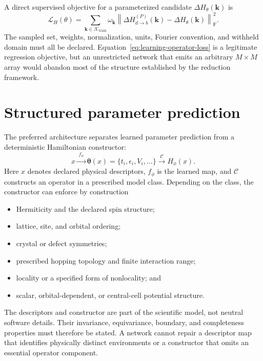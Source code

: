 A direct supervised objective for a parameterized candidate
$\Delta H_{\theta}(\mathbf k)$ is
\begin{equation}
  \mathcal L_H(\theta)
  =
  \sum_{\mathbf k\in\mathcal K_{\mathrm{train}}}
  \omega_{\mathbf k}
  \left\|
    \Delta H_{d\to b}^{(P)}(\mathbf k)
    -\Delta H_{\theta}(\mathbf k)
  \right\|_{\mathrm F}^{2}.
  \label{eq:learning-operator-loss}
\end{equation}
The sampled set, weights, normalization, units, Fourier convention, and
withheld domain must all be declared. Equation~\eqref{eq:learning-operator-loss}
is a legitimate regression objective, but an unrestricted network that emits
an arbitrary $M\times M$ array would abandon most of the structure established
by the reduction framework.

\section{Structured parameter prediction}

The preferred architecture separates learned parameter prediction from a
deterministic Hamiltonian constructor:
\begin{equation}
  x
  \xrightarrow{\;f_{\phi}\;}
  \boldsymbol\theta(x)
  =\{t_i,\epsilon_i,V_i,\ldots\}
  \xrightarrow{\;\mathcal C\;}
  H_{\phi}(x).
  \label{eq:structured-learning-map}
\end{equation}
Here $x$ denotes declared physical descriptors, $f_{\phi}$ is the learned map,
and $\mathcal C$ constructs an operator in a prescribed model class. Depending
on the class, the constructor can enforce by construction

\begin{itemize}
  \item Hermiticity and the declared spin structure;
  \item lattice, site, and orbital ordering;
  \item crystal or defect symmetries;
  \item prescribed hopping topology and finite interaction range;
  \item locality or a specified form of nonlocality; and
  \item scalar, orbital-dependent, or central-cell potential structure.
\end{itemize}

The descriptors and constructor are part of the scientific model, not neutral
software details. Their invariance, equivariance, boundary, and completeness
properties must therefore be stated. A network cannot repair a descriptor map
that identifies physically distinct environments or a constructor that omits
an essential operator component.

